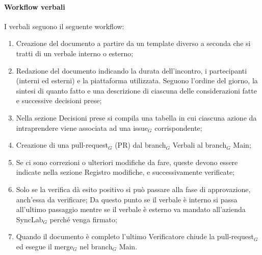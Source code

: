 \documentclass[10pt]{article}
\begin{document}
\begin{justify}
        \paragraph{Workflow verbali}
        I verbali seguono il seguente workflow:
        \begin{enumerate}
            \item Creazione del documento a partire da un template diverso a seconda che si tratti di un verbale interno o esterno;
            \item Redazione del documento indicando la durata dell'incontro, i partecipanti (interni ed esterni) e la piattaforma utilizzata. Seguono l'ordine del giorno, la sintesi di quanto fatto e una descrizione di ciascuna delle considerazioni fatte e successive decisioni prese;
            \item Nella sezione Decisioni prese si compila una
            tabella in cui ciascuna azione da intraprendere viene associata ad una issue$_G$ corrispondente;
            \item Creazione di una pull-request$_G$ (PR) dal branch$_G$ Verbali al branch$_G$ Main;
            \item Se ci sono correzioni o ulteriori modifiche da fare, queste devono essere indicate nella sezione Registro modifiche, e successivamente verificate;
            \item Solo se la verifica dà esito positivo si può passare alla fase di approvazione, anch'essa da verificare;
            Da questo punto se il verbale è interno si passa all'ultimo passaggio mentre se il verbale è esterno va mandato all'azienda SyncLab$_G$ perché venga firmato;
            \item Quando il documento è completo l'ultimo Verificatore
            chiude la pull-request$_G$ ed esegue il merge$_G$ nel branch$_G$ Main.
        \end{enumerate}


\end{justify}
\end{document}
